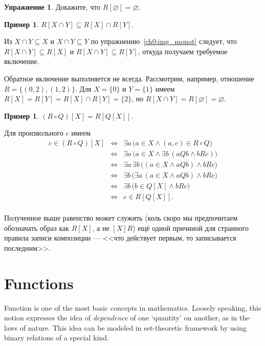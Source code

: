 \documentclass[12pt,notitlepage]{article}
\theoremstyle{plain}
\theoremstyle{definition}
\newtheorem{exc}[thm]{Упражнение}
\newtheorem{exm}[thm]{Пример}
\theoremstyle{plain}
\newcommand{\sbs}{\subseteq}
\newcommand{\void}{\varnothing}
\newcommand{\1}{\mathbf{1}}
\newcommand{\0}{\mathbf{0}}
\begin{document}
\begin{exc}
	Докажите, что $R[\void] = \void$.
\end{exc}

\begin{exm}\label{ch0:exm25}
	$R[X \cap Y] \sbs R[X] \cap R[Y]$.
	
	Из $X \cap Y \sbs X$ и $X \cap Y \sbs Y$ по упражнению~\ref{ch0:img_monot} следует, что $R[X \cap Y] \sbs R[X]$ и $R[X \cap Y] \sbs R[Y]$, откуда получаем требуемое включение.
	
	Обратное включение выполняется не всегда. Рассмотрим, например, отношение $R = \{(0,2), (1,2)\}$. Для $X = \{0\}$ и $Y = \{1\}$ имеем $R[X] = R[Y] = R[X] \cap R[Y]  = \{2\}$, но $R[X \cap Y] = R[\void] = \void$.
\end{exm}

\begin{exm}
	$(R \circ Q)[X] = R[Q[X]]$.
	
	Для произвольного $c$ имеем
	$$
	\begin{array}{rcl}
		c \in (R \circ Q)[X] &\iff& \exists a\, \bigl( a \in X \wedge (a,c) \in R \circ Q \bigr)\\
		&\iff& \exists a\, \bigl( a \in X \wedge \exists b\, ( a Q b \wedge b R c) \bigr)\\
		&\iff& \exists a\, \exists b\,\bigl( (a \in X \wedge a Q b) \wedge b R c \bigr)\\
		&\iff& \exists b\, \bigl( \exists a\, (a \in X \wedge a Q b) \wedge b R c \bigr)\\
		&\iff& \exists b\, \bigl( b \in Q[X] \wedge b R c \bigr)\\
		&\iff& c \in R[Q[X]].\\
	\end{array}
	$$
\end{exm}
Полученное выше равенство может служить (коль скоро мы предпочитаем обозначать образ как $R[X]$, а не $[X]R$) ещё одной причиной для странного правила записи композиции --- <<что действует первым, то записывается последним>>.

\section{Functions}
Function is one of the most basic concepts in mathematics. Loosely speaking, this notion expresses the idea of \emph{dependence} of one `quantity' on another, as in the laws of nature. This idea can be modeled in set-theoretic framework by using binary relations of a special kind.
\end{document}
